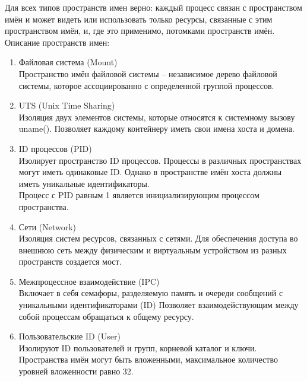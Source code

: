 \documentclass[a4paper,14pt]{extreport} %
\begin{document}
Для всех типов пространств имен верно: каждый процесс связан с пространством имён и может видеть или использовать только ресурсы, связанные с этим пространством имён, и, где это применимо, потомками пространств имён. \\
Описание пространств имен:
\begin{enumerate}
\item Файловая система (Mount) \\
Пространство имён файловой системы --  независимое дерево файловой системы, которое ассоциированно с определенной группой процессов.
\item UTS (Unix Time Sharing) \\
Изоляция двух элементов системы, которые относятся к системному вызову uname(). Позволяет каждому контейнеру иметь свои имена хоста и домена.
\item ID процессов (PID) \\
Изолирует пространство ID процессов. Процессы в различных пространствах могут иметь одинаковые ID. Однако в пространстве имён хоста должны иметь уникальные идентификаторы. \\
Процесс с PID равным 1 является инициализирующим процессом пространства.
\item Сети (Network) \\
Изоляция систем ресурсов, связанных с сетями.
Для обеспечения доступа во внешнюю сеть между физическим и виртуальным устройством из разных пространств создается мост.
\item Межпроцессное взаимодействие (IPC) \\
Включает в себя семафоры, разделяемую память и очереди сообщений с уникальными идентификаторами (ID) Позволяет взаимодействующим между собой процессам обращаться к общему ресурсу.
\item Пользовательские ID (User) \\
Изолируют ID пользователей и групп, корневой каталог и ключи. Пространства имён могут быть вложенными, максимальное количество уровней вложенности равно 32.
\end{enumerate}
\end{document}

